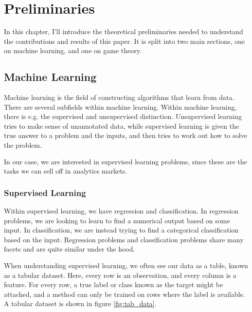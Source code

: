 
\chapter{Preliminaries}

In this chapter, I'll introduce the theoretical preliminaries needed to
understand the contributions and results of this paper. It is split into two main sections,
one on machine learning, and one on game theory. 

\section{Machine Learning}
Machine learning is the field of constructing algorithms that learn from data.
There are several subfields within machine learning. Within machine learning,
there is e.g. the supervised and unsupervised distinction. Unsupervised
learning tries to make sense of unannotated data, while supervised learning is
given the true answer to a problem and the inputs, and then tries to work out
how to solve the problem.

In our case, we are interested in supervised learning problems, since
these are the tasks we can sell off in analytics markets.

\subsection{Supervised Learning}
Within supervised learning, we have regression and classification. In
regression problems, we are looking to learn to find a numerical output based
on some input. In classification, we are instead trying to find a categorical
classification based on the input. Regression problems and classification
problems share many facets and are quite similar under the hood.

When understanding supervised learning, we often see our data as a table, known
as a tabular dataset. Here, every row is an observation, and every column is a
feature. For every row, a true label or class known as the target might be
attached, and a method can only be trained on rows where the label is available.
A tabular dataset is shown in figure \ref{fig:tab_data}.

